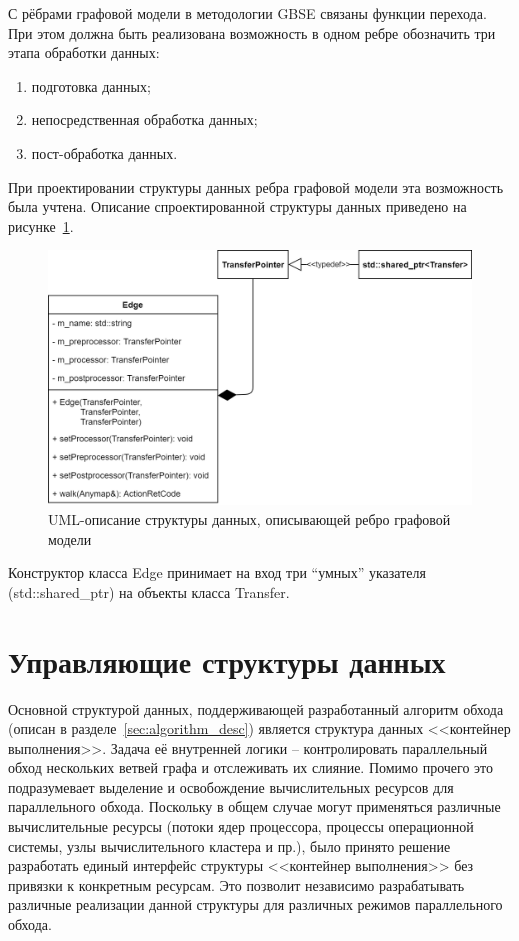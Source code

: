 С рёбрами графовой модели в методологии GBSE связаны функции перехода. При этом должна быть реализована возможность в одном ребре обозначить три этапа обработки данных:
\begin{enumerate}
    \item подготовка данных;
    \item непосредственная обработка данных;
    \item пост-обработка данных.
\end{enumerate}
При проектировании структуры данных ребра графовой модели эта возможность была учтена. Описание спроектированной структуры данных приведено на рисунке~\ref{fig:UMLEdge}.
\begin{figure}[!ht]
    \centering
    \includegraphics[height=0.27\textheight]{figures/UML.edge.png}
    \caption{UML-описание структуры данных, описывающей ребро графовой модели}
    \label{fig:UMLEdge}
\end{figure}
Конструктор класса \textsf{Edge} принимает на вход три ``умных'' указателя (\textsf{std::shared_ptr}) на объекты класса \textsf{Transfer}.
\section{Управляющие структуры данных}
Основной структурой данных, поддерживающей разработанный алгоритм обхода (описан в разделе~\ref{sec:algorithm_desc}) является структура данных <<контейнер выполнения>>. Задача её внутренней логики -- контролировать параллельный обход нескольких ветвей графа и отслеживать их слияние. Помимо прочего это подразумевает выделение и освобождение вычислительных ресурсов для параллельного обхода. Поскольку в общем случае могут применяться различные вычислительные ресурсы (потоки ядер процессора, процессы операционной системы, узлы вычислительного кластера и пр.), было принято решение разработать единый интерфейс структуры <<контейнер выполнения>> без привязки к конкретным ресурсам. Это позволит независимо разрабатывать различные реализации данной структуры для различных режимов параллельного обхода.

